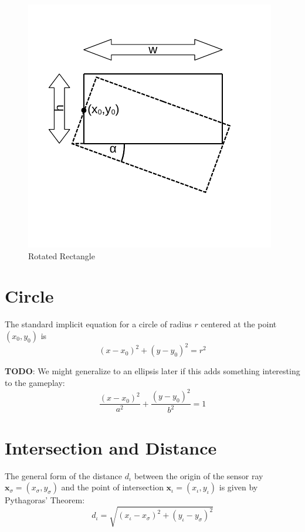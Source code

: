 \documentclass[11pt]{article}
\newcommand{\diota}{d_\iota}
\newcommand{\xiota}{x_\iota}
\newcommand{\xsigma}{x_\sigma}
\newcommand{\yiota}{y_\iota}
\newcommand{\ysigma}{y_\sigma}
\newcommand{\bfx}{\mathbf{x}}
\newcommand{\TODO}{{\bf TODO}}
\begin{document}
\begin{figure}
    \centering
    \includegraphics[trim=10 40 10 20]{rectangle.pdf}
    \caption{Rotated Rectangle}\label{fig-rectangle}
\end{figure}

\section{Circle}
\label{sec-circle}

The standard implicit equation for a circle of radius $r$  centered at the
point $(x_0, y_0)$ is
\begin{equation}
    (x - x_0)^2 + (y - y_0)^2 = r^2\label{eq-circle}
\end{equation}

\TODO: We might generalize to an ellipsis later if this adds something
interesting to the gameplay:
\begin{equation}
    \frac{(x-x_0)^2}{a^2} + \frac{(y-y_0)^2}{b^2} = 1
\end{equation}

\section{Intersection and Distance}
\label{sec-intersection-distance}

The general form of the distance $\diota$ between the origin of the sensor ray
$\bfx_\sigma=(\xsigma,\ysigma)$ and the point of intersection
$\bfx_\iota=(\xiota,\yiota)$ is given by Pythagoras' Theorem:
\begin{equation}
    \diota = \sqrt{(\xiota-\xsigma)^2 + (\yiota-\ysigma)^2}
\end{equation}
\end{document}
